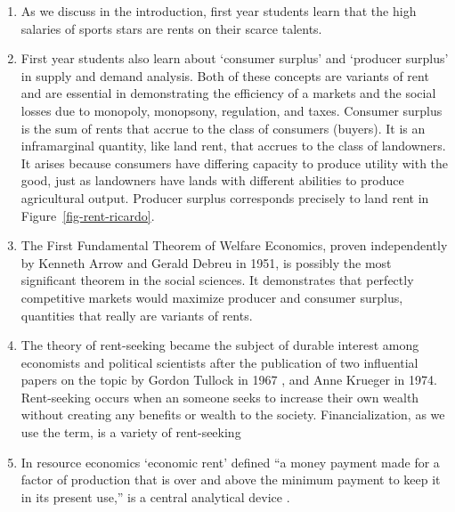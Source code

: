 \begin{enumerate}

    \item As we discuss in the introduction, first year students learn that the high salaries of sports stars are rents on their scarce talents. 

 \item First year students also learn about `consumer surplus' and `producer surplus' in supply and demand analysis. Both of these concepts are variants of rent and are essential in demonstrating the efficiency of a markets and the social losses due to \gls{monopoly}, \gls{monopsony}, regulation, and taxes. Consumer surplus is the sum of rents that accrue to the class of consumers (buyers). It is an \gls{inframarginal} quantity, like land  rent, that accrues to the class of landowners. It arises because consumers have differing capacity to produce  utility with the good, just as landowners have lands with different abilities to produce agricultural output. Producer surplus corresponds precisely to land rent in Figure~\ref{fig-rent-ricardo}.

    \item The First Fundamental Theorem of Welfare Economics, proven independently by Kenneth Arrow \cite{arrowExtensionBasicTheorems1951} and  Gerald Debreu \cite{debreuCoefficientResourceUtilization1951}  in 1951, is possibly the most significant theorem in the social sciences. It demonstrates that perfectly competitive markets would maximize producer and consumer surplus, quantities that really are variants of rents.

    \item The theory of \gls{rent-seeking}  became the subject of durable interest among economists and political scientists after the publication of two influential papers on the topic by Gordon Tullock in 1967 \cite{tullockWelfareCostsTariffs1967}, and Anne Krueger \cite{kruegerPoliticalEconomyRentSeeking1974} in 1974. Rent-seeking occurs when an someone seeks to increase their own wealth without creating any benefits or wealth to the society. Financialization, as we use the term, is a variety of rent-seeking

\item In resource economics `economic rent' defined ``a money payment made for a factor of production that is over and above the minimum payment to keep it in its present use,'' is a central analytical device \cite{Gray1914RentUT}.   
    

\end{enumerate}
